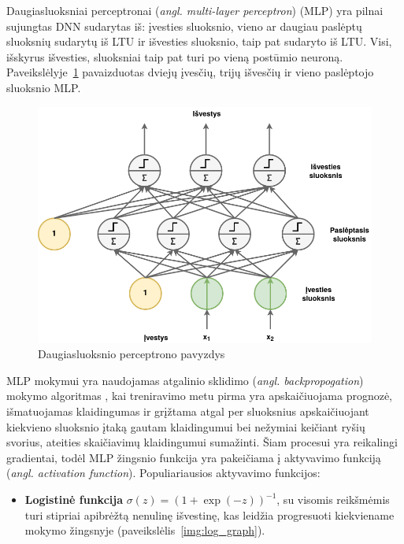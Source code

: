 \documentclass{VUMIFPSbakalaurinis}
\begin{document}
{
	Daugiasluoksniai perceptronai (\textit{angl. multi-layer perceptron}) (MLP) yra pilnai sujungtas DNN sudarytas iš: įvesties sluoksnio, vieno ar daugiau paslėptų sluoksnių sudarytų iš LTU ir išvesties sluoksnio, taip pat sudaryto iš LTU. Visi, išskyrus išvesties, sluoksniai taip pat turi po vieną postūmio neuroną. Paveikslėlyje~\ref{img:mlp} pavaizduotas dviejų įvesčių, trijų išvesčių ir vieno paslėptojo sluoksnio MLP.
	
	\begin{figure}[H]
		\centering
		\includegraphics[scale=0.5]{img/mlp}
		\caption{Daugiasluoksnio perceptrono pavyzdys}
		\label{img:mlp}
	\end{figure} 
	
	MLP mokymui yra naudojamas atgalinio sklidimo (\textit{angl. backpropogation}) mokymo algoritmas \cite{rumelhart1985learning}, kai treniravimo metu pirma yra apskaičiuojama prognozė, išmatuojamas klaidingumas ir grįžtama atgal per sluoksnius apskaičiuojant kiekvieno sluoksnio įtaką gautam klaidingumui bei nežymiai keičiant ryšių svorius, ateities skaičiavimų klaidingumui sumažinti. Šiam procesui yra reikalingi gradientai, todėl MLP žingsnio funkcija yra pakeičiama į aktyvavimo funkciją (\textit{angl. activation function}). Populiariausios aktyvavimo funkcijos:
	
	\begin{itemize}
		\item \textbf{Logistinė funkcija} \(\sigma(z) = (1 + \exp(-z))^{-1}\), su visomis reikšmėmis turi stipriai apibrėžtą nenulinę išvestinę, kas leidžia progresuoti kiekviename mokymo žingsnyje (paveikslėlis~\ref{img:log_graph}).
		

\end{itemize}}
\end{document}
